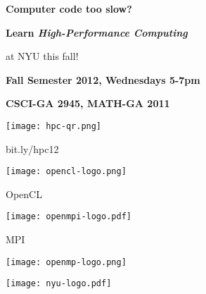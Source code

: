 \documentclass[10pt]{article}
\begin{document}
%
%
\vspace{-5ex}

\begin{center}
  {\bfseries\Large
    Computer code too slow?\\[2mm]
  }
  {\bfseries\huge
    Learn \emph{High-Performance Computing}

    at NYU this fall!
  }
\end{center}
\vspace{8mm}

\begin{multicols}{2}

\end{multicols}

\vspace{1cm}
\begin{center}
  {\bfseries\Huge
    Fall Semester 2012, Wednesdays 5-7pm
  }

  {\bfseries\Large CSCI-GA 2945, MATH-GA 2011 }

\end{center}

\begin{center}
  \begin{minipage}{0.2\textwidth}
    \centering
    \texttt{[image: hpc-qr.png]}

    \LARGE\textsf{bit.ly/hpc12}
  \end{minipage}%
  \begin{minipage}{0.2\textwidth}
    \centering
    \texttt{[image: opencl-logo.png]}

    \Large{}\selectfont OpenCL
  \end{minipage}%
  \begin{minipage}{0.2\textwidth}
    \centering
    \texttt{[image: openmpi-logo.pdf]}

    \Large{}\selectfont MPI
  \end{minipage}%
  \begin{minipage}{0.2\textwidth}
    \texttt{[image: openmp-logo.png]}
  \end{minipage}%
  \begin{minipage}{0.2\textwidth}
    \centering
    \texttt{[image: nyu-logo.pdf]}
  \end{minipage}
\end{center}
\end{document}
